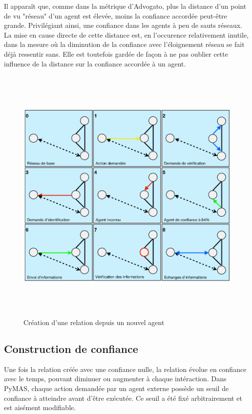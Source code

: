 \documentclass[11pt]{book}
\begin{document}
Il apparaît que, comme dans la métrique d'Advogato, plus la distance d'un 
point de vu "réseau" d'un agent est élevée, moins la confiance accordée 
peut-être grande. Privilégiant ainsi, une confiance dans les agents à 
peu de sauts réseaux. La mise en cause directe de cette distance est, en 
l'occurence relativement inutile, dans la mesure où la diminution de la 
confiance avec l'éloignement réseau se fait déjà ressentir sans. Elle est 
toutefois gardée de façon à ne pas oublier cette influence de la distance sur
la confiance accordée à un agent.
\begin{figure}[ht]
  \begin{center}
    \includegraphics[height=13cm]{imgs/evolution.png}
    \caption{Création d'une relation depuis un nouvel agent}
  \end{center}
\end{figure}

\subsection{Construction de confiance}
Une fois la relation créée avec une confiance nulle, la relation évolue en 
confiance avec le temps, pouvant diminuer ou augmenter à chaque intéraction.
Dans PyMAS, chaque action demandée par un agent externe possède un seuil 
de confiance à atteindre avant d'être exécutée. Ce seuil a été fixé 
arbitrairement et est aisément modifiable. 
\end{document}

